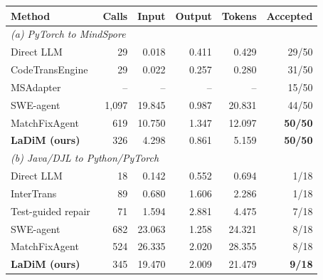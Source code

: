 \begin{tabular*}{\linewidth}{@{\extracolsep{\fill}}lrrrrr@{}}
\toprule
\textbf{Method} & \textbf{Calls} & \textbf{Input} & \textbf{Output} & \textbf{Tokens} & \textbf{Accepted} \\
\midrule
\multicolumn{6}{l}{\textit{(a) PyTorch to MindSpore}} \\
Direct LLM & 29 & 0.018 & 0.411 & 0.429 & 29/50 \\
CodeTransEngine~\citep{macedo2025codetransengine} & 29 & 0.022 & 0.257 & 0.280 & 31/50 \\
MSAdapter~\citep{openi2025msadapter} & -- & -- & -- & -- & 15/50 \\
SWE-agent~\citep{yang2024sweagent} & 1,097 & 19.845 & 0.987 & 20.831 & 44/50 \\
MatchFixAgent~\citep{ibrahimzada2025matchfixagent} & 619 & 10.750 & 1.347 & 12.097 & \textbf{50/50} \\
\textbf{LaDiM (ours)} & 326 & 4.298 & 0.861 & 5.159 & \textbf{50/50} \\
\midrule
\multicolumn{6}{l}{\textit{(b) Java/DJL to Python/PyTorch}} \\
Direct LLM & 18 & 0.142 & 0.552 & 0.694 & 1/18 \\
InterTrans~\citep{macedo2024intertrans} & 89 & 0.680 & 1.606 & 2.286 & 1/18 \\
Test-guided repair & 71 & 1.594 & 2.881 & 4.475 & 7/18 \\
SWE-agent & 682 & 23.063 & 1.258 & 24.321 & 8/18 \\
MatchFixAgent & 524 & 26.335 & 2.020 & 28.355 & 8/18 \\
\textbf{LaDiM (ours)} & 345 & 19.470 & 2.009 & 21.479 & \textbf{9/18} \\
\bottomrule
\end{tabular*}
